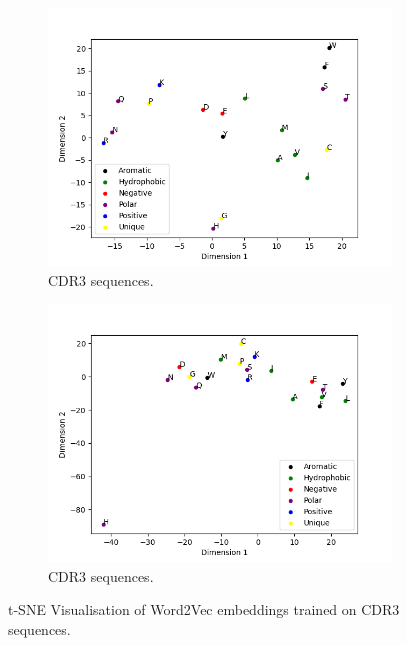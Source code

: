 \begin{figure}[H]
\centering
\begin{subfigure}[b]{0.47\textwidth}
   \includegraphics[width=1.125\linewidth]{figures/embedding_cdr3a.png}
   \caption{ CDR3{\textalpha} sequences.}
   \label{fig:emb_cdr3a} 
\end{subfigure}
\begin{subfigure}[b]{0.47\textwidth}
   \includegraphics[width=1.125\linewidth]{figures/embedding_cdr3b.png}
   \caption{CDR3{\textbeta} sequences.}
   \label{fig:emb_cdr3b}
\end{subfigure}
\caption{t-SNE Visualisation of Word2Vec embeddings trained on CDR3 sequences.}
\label{fig:emb_cdr3}
\end{figure}

